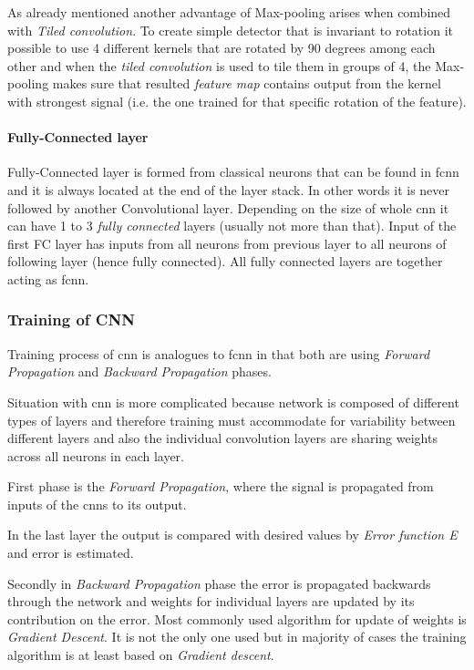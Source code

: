 \documentclass[11pt]{article}
\begin{document}
As already mentioned another advantage of Max-pooling arises when combined with \emph{Tiled convolution}. To create simple detector that is invariant to rotation it possible to use 4 different kernels that are rotated by 90 degrees among each other and when the \emph{tiled convolution} is used to tile them in groups of 4, the Max-pooling makes sure that resulted \emph{feature map} contains output from the kernel with strongest signal (i.e. the one trained for that specific rotation of the feature).

\paragraph{Fully-Connected layer}
\label{sec:org7f6f01d}

Fully-Connected layer is formed from classical neurons that can be found in \gls{fcnn} and it is always located at the end of the layer stack. In other words it is never followed by another Convolutional layer. Depending on the size of whole \gls{cnn} it can have 1 to 3 \emph{fully connected} layers (usually not more than that). Input of the first FC layer has inputs from all neurons from previous layer to all neurons of following layer (hence fully connected). All fully connected layers are together acting as \gls{fcnn}.

\subsubsection{Training of CNN}
\label{sec:org721f7c5}
Training process of \gls{cnn} is analogues to \gls{fcnn} in that both are using \emph{Forward Propagation} and \emph{Backward Propagation} phases.

Situation with \gls{cnn} is more complicated because network is composed of different types of layers and therefore training must accommodate for variability between different layers and also the individual convolution layers are sharing weights across all neurons in each layer.

First phase is the \emph{Forward Propagation}, where the signal is propagated from inputs of the \glspl{cnn} to its output.

In the last layer the output is compared with desired values by \emph{Error function E} and error is estimated.

Secondly in \emph{Backward Propagation} phase the error is propagated backwards through the network and weights for individual layers are updated by its contribution on the error. Most commonly used algorithm for update of weights is \emph{Gradient Descent}. It is not the only one used but in majority of cases the training algorithm is at least based on \emph{Gradient descent}.
\end{document}

